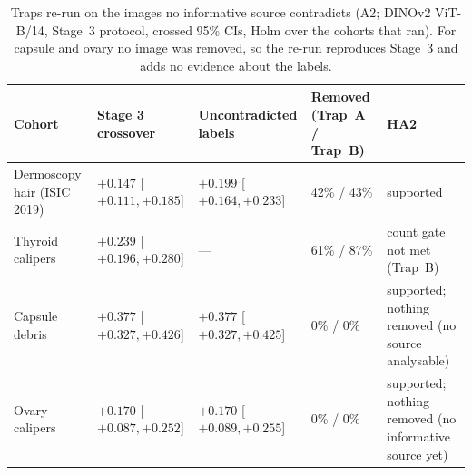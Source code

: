 \begin{table}[H]\centering\scriptsize
\caption{Traps re-run on the images no informative source contradicts (A2; DINOv2 ViT-B/14, Stage~3 protocol, crossed 95\% CIs, Holm over the cohorts that ran). For capsule and ovary no image was removed, so the re-run reproduces Stage~3 and adds no evidence about the labels.}\label{tab:clean}
\begin{tabular}{p{3.2cm}p{2.6cm}p{2.6cm}p{2.4cm}p{4.0cm}}\toprule
Cohort & Stage 3 crossover & Uncontradicted labels & Removed (Trap~A / Trap~B) & HA2 \\\midrule
Dermoscopy hair (ISIC 2019) & $+0.147$ [$+0.111, +0.185$] & $+0.199$ [$+0.164, +0.233$] & 42\% / 43\% & supported \\
Thyroid calipers & $+0.239$ [$+0.196, +0.280$] & --- & 61\% / 87\% & count gate not met (Trap~B) \\
Capsule debris & $+0.377$ [$+0.327, +0.426$] & $+0.377$ [$+0.327, +0.425$] & 0\% / 0\% & supported; nothing removed (no source analysable) \\
Ovary calipers & $+0.170$ [$+0.087, +0.252$] & $+0.170$ [$+0.089, +0.255$] & 0\% / 0\% & supported; nothing removed (no informative source yet) \\
\bottomrule\end{tabular}
\end{table}

